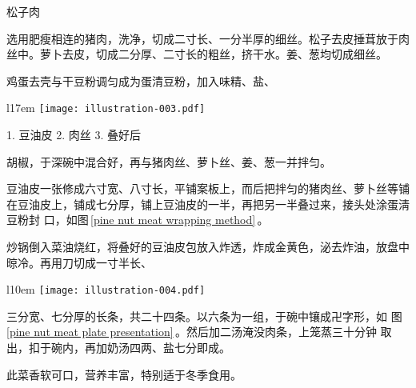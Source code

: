 \begin{recipe}{松子肉}

\ingredients


\preparation

\step 选用肥瘦相连的猪肉，洗净，切成二寸长、一分半厚的细丝。松子去皮捶茸放于肉
丝中。萝卜去皮，切成二分厚、二寸长的粗丝，挤干水。姜、葱均切成细丝。

\step 鸡蛋去壳与干豆粉调匀成为蛋清豆粉，加入味精、盐、
\begin{wrapfigure}[7]{l}{17em}%
\centering%
\vspace{-.4375\baselineskip}%
\texttt{[image: illustration-003.pdf]}%
\vspace{-.5625\baselineskip}%
\caption{松子肉包叠法图}%
\label{pine nut meat wrapping method}%
{\small 1. 豆油皮 2. 肉丝 3. 叠好后}%
\end{wrapfigure}%
胡椒，于深碗中混合好，再与猪肉丝、萝卜丝、姜、葱一并拌匀。

\step 豆油皮一张修成六寸宽、八寸长，平铺案板上，而后把拌匀的猪肉丝、萝卜丝等铺
在豆油皮上，铺成七分厚，铺上豆油皮的一半，再把另一半叠过来，接头处涂蛋淸豆粉封
口，如图\,\ref{pine nut meat wrapping method}\,。

\step 炒锅倒入菜油烧红，将叠好的豆油皮包放入炸透，炸成金黄色，泌去炸油，放盘中
晾冷。再用刀切成一寸半长、
\begin{wrapfigure}[5]{l}{10em}%
\centering%
\vspace{-1.25\baselineskip}%
\texttt{[image: illustration-004.pdf]}%
\vspace{-.5625\baselineskip}%
\caption{松子肉摆法}%
\label{pine nut meat plate presentation}%
\end{wrapfigure}%
三分宽、七分厚的长条，共二十四条。以六条为一组，于碗中镶成卍字形，如
图\,\ref{pine nut meat plate presentation}\,。然后加二汤淹没肉条，上笼蒸三十分钟
取出，扣于碗内，再加奶汤四两、盐七分即成。

\features

此菜香软可口，营养丰富，特别适于冬季食用。

\end{recipe}


